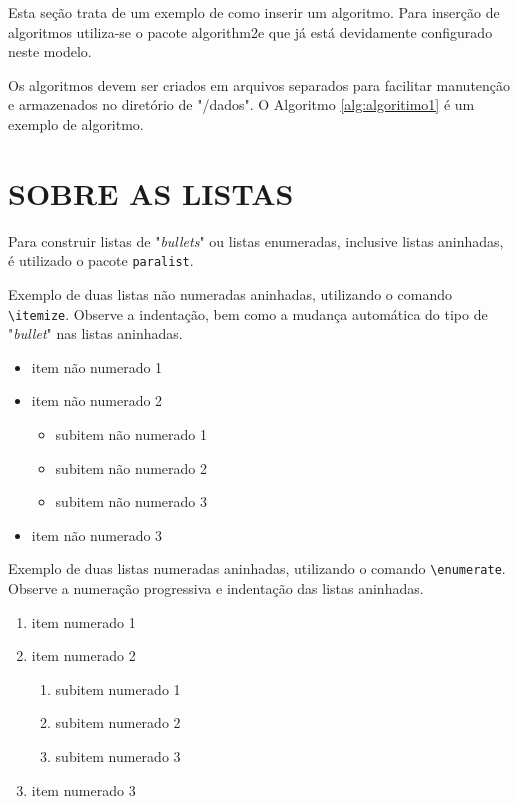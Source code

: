 Esta seção trata de um exemplo de como inserir um algoritmo. Para inserção de algoritmos utiliza-se o pacote {\ttfamily algorithm2e} que já está devidamente configurado neste modelo.

Os algoritmos devem ser criados em arquivos separados para facilitar manutenção e armazenados no diretório de "/dados". O Algoritmo \ref{alg:algoritimo1} é um exemplo de algoritmo.  



\section{SOBRE AS LISTAS}
\label{sec:apSobreLista}

Para construir listas de "\textit{bullets}"{} ou listas enumeradas, inclusive listas aninhadas, é utilizado o pacote \verb|paralist|.

Exemplo de duas listas não numeradas aninhadas, utilizando o comando \verb|\itemize|. Observe a indentação, bem como a mudança automática do tipo de "\textit{bullet}"{} nas listas aninhadas.

\begin{itemize}
    \item item não numerado 1
    \item item não numerado 2
    \begin{itemize}
        \item subitem não numerado 1
        \item subitem não numerado 2
        \item subitem não numerado 3
    \end{itemize}
    \item item não numerado 3
\end{itemize}

Exemplo de duas listas numeradas aninhadas, utilizando o comando \verb|\enumerate|. Observe a numeração progressiva e indentação das listas aninhadas.

\begin{enumerate}
    \item item numerado 1
    \item item numerado 2
    \begin{enumerate}
        \item subitem numerado 1
        \item subitem numerado 2
        \item subitem numerado 3
    \end{enumerate}
    \item item numerado 3
\end{enumerate}

